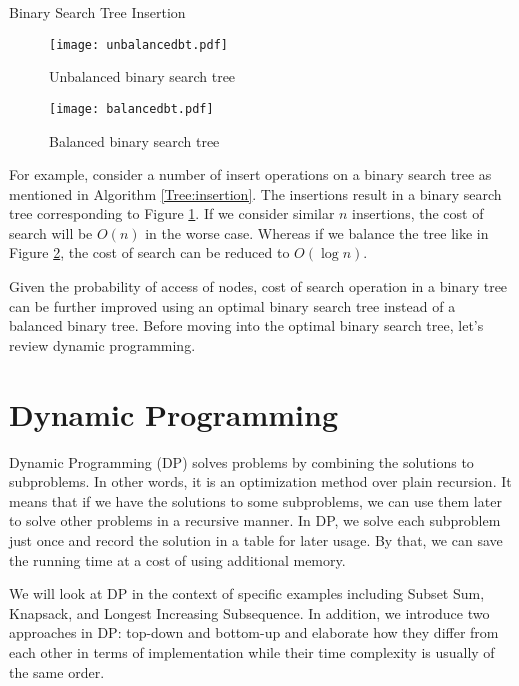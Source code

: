 \documentclass[11pt]{article}
\theoremstyle{definition}
\begin{document}
    \begin{algorithm}[H]
        \caption{Binary Search Tree Insertion}\label{Tree:insertion}
        \begin{algorithmic}[1]
            \State {}
            \State {}
            \State {}
            \State {}
        \end{algorithmic}
    \end{algorithm}
    
    \begin{figure}[tbh]
        \centering
        \texttt{[image: unbalancedbt.pdf]}
        \caption{Unbalanced binary search tree}
        \label{fig:unbalancedBT}
    \end{figure}
    \begin{figure}[tbh]
        \centering
        \texttt{[image: balancedbt.pdf]}
        \caption{Balanced binary search tree}
        \label{fig:balancedBT}
    \end{figure}
    
    For example, consider a number of insert operations on a binary search tree as mentioned in Algorithm \ref{Tree:insertion}. The insertions result in a binary search tree corresponding to Figure \ref{fig:unbalancedBT}. If we consider similar $n$ insertions, the cost of search will be $O(n)$ in the worse case. Whereas if we balance the tree like in Figure \ref{fig:balancedBT}, the cost of search can be reduced to $O(\log{n})$.

    Given the probability of access of nodes, cost of search operation in a binary tree can be further improved using an optimal binary search tree instead of a balanced binary tree. Before moving into the optimal binary search tree, let's review dynamic programming.
    
\section{Dynamic Programming}
Dynamic Programming (DP) solves problems by combining the solutions to subproblems. In other words, it is an optimization method over plain recursion. It means that if we have the solutions to some subproblems, we can use them later to solve other problems in a recursive manner. In DP, we solve each subproblem just once and record the solution in a table for later usage. By that, we can save the running time at a cost of using additional memory.

We will look at DP in the context of specific examples including Subset Sum, Knapsack, and Longest Increasing Subsequence. In addition, we introduce two approaches in DP: top-down and bottom-up and elaborate how they differ from each other in terms of implementation while their time complexity is usually of the same order.
\end{document}
